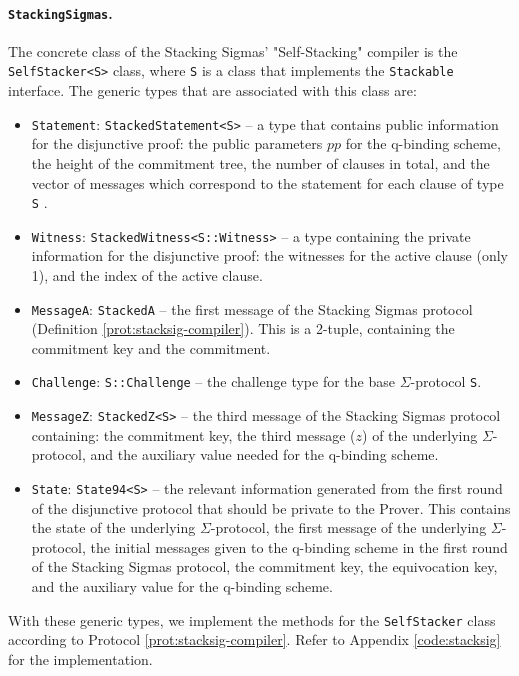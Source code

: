 \paragraph{\texttt{StackingSigmas}.} The concrete class of the Stacking 
Sigmas' "Self-Stacking" compiler is the \texttt{Self\-Stacker<S>} class, where \texttt{S} 
is a class that implements the \texttt{Stackable} interface. The generic types that 
are associated with this class are:
\begin{itemize}
  \item \texttt{Statement}: \texttt{StackedStatement<S>} -- a type that contains public information 
  for the disjunctive proof: the public parameters $pp$ for the q-binding scheme, 
  the height of the commitment tree, the number of clauses in total, and the 
  vector of messages which correspond to the statement 
  for each clause of type \texttt{S} .
  \item \texttt{Witness}: \texttt{StackedWitness<S::Witness>} -- a type containing the 
  private information for the disjunctive proof: the witnesses for the active clause (only 1), 
  and the index of the active clause.
  \item \texttt{MessageA}: \texttt{StackedA} -- the first message of the Stacking Sigmas 
  protocol (Definition \ref{prot:stacksig-compiler}). This is a 2-tuple, containing 
  the commitment key and the commitment. 
  \item \texttt{Challenge}: \texttt{S::Challenge} -- the challenge type for the base $\Sigma$-protocol \texttt{S}.
  \item \texttt{MessageZ}: \texttt{StackedZ<S>} -- the third message of the Stacking 
  Sigmas protocol containing: the commitment key, the third message ($z$) of the 
  underlying $\Sigma$-protocol, and the auxiliary value needed for the q-binding scheme.
  \item \texttt{State}: \texttt{State94<S>} -- the relevant information generated from the first round
  of the disjunctive protocol that should be private to the Prover. This 
  contains the state of the underlying $\Sigma$-protocol, the first message of the 
  underlying $\Sigma$-protocol, the initial messages given to the q-binding scheme 
  in the first round of the Stacking Sigmas protocol, the commitment key, the equivocation 
  key, and the auxiliary value for the q-binding scheme.
\end{itemize}

With these generic types, we implement the methods for the \texttt{SelfStacker} class
according to Protocol \ref{prot:stacksig-compiler}. Refer to Appendix \ref{code:stacksig} 
for the implementation.